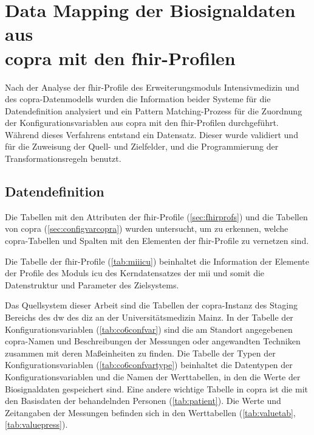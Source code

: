 \section[Data Mapping der Biosignaldaten aus \acs{copra} mit den \acs{fhir}-Profilen]{Data Mapping der Biosignaldaten aus \\ \acs{copra} mit den \acs{fhir}-Profilen} \label{sec:datamappingicucopra}

Nach der Analyse der \ac{fhir}-Profile des Erweiterungsmoduls \glqq Intensivmedizin\grqq{} und des \ac{copra}-Datenmodells wurden die Information beider Systeme für die Datendefinition analysiert und ein Pattern Matching-Prozess für die Zuordnung der Konfigurationsvariablen aus \ac{copra} mit den \ac{fhir}-Profilen durchgeführt. Während dieses Verfahrens entstand ein Datensatz. Dieser wurde validiert und für die Zuweisung der Quell- und Zielfelder, und die Programmierung der Transformationsregeln benutzt.

\subsection{Datendefinition} \label{subsec:datadef}

Die Tabellen mit den Attributen der \ac{fhir}-Profile (\ref{sec:fhirprofs}) und die Tabellen von \ac{copra} (\ref{sec:configvarcopra}) wurden untersucht, um zu erkennen, welche \ac{copra}-Tabellen und Spalten mit den Elementen der \ac{fhir}-Profile zu vernetzen sind.

Die Tabelle der \ac{fhir}-Profile (\ref{tab:miiicu}) beinhaltet die Information der Elemente der Profile des Moduls \glqq\ac{icu}\grqq{} des Kerndatensatzes der \ac{mii} und somit die Datenstruktur und Parameter des Zielsystems.

Das Quellsystem dieser Arbeit sind die Tabellen der \ac{copra}-Instanz des Staging Bereichs des \ac{dw} des \ac{diz} an der Universitätsmedizin Mainz. In der Tabelle der Konfigurationsvariablen (\ref{tab:co6confvar}) sind die am Standort angegebenen \ac{copra}-Namen und Beschreibungen der Messungen oder angewandten Techniken zusammen mit deren Maßeinheiten zu finden. Die Tabelle der Typen der Konfigurationsvariablen (\ref{tab:co6confvartype}) beinhaltet die Datentypen der Konfigurationsvariablen und die Namen der Werttabellen, in den die Werte der Biosignaldaten gespeichert sind. Eine andere wichtige Tabelle in \ac{copra} ist die mit den Basisdaten der behandelnden Personen (\ref{tab:patient}). Die Werte und Zeitangaben der Messungen befinden sich in den Werttabellen (\ref{tab:valuetab}, \ref{tab:valuepress}).

